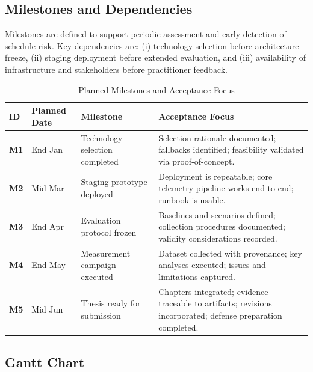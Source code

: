\subsection{Milestones and Dependencies}

Milestones are defined to support periodic assessment and early detection of schedule risk. Key dependencies are: (i) technology selection before architecture freeze, (ii) staging deployment before extended evaluation, and (iii) availability of infrastructure and stakeholders before practitioner feedback.

\begin{table}[htbp]
\centering
\caption{Planned Milestones and Acceptance Focus}
\label{tab:milestones}
\footnotesize
\begin{tabular}{@{}p{}p{}p{}p{}@{}}
		\toprule
		\textbf{ID} & \textbf{Planned Date} & \textbf{Milestone} & \textbf{Acceptance Focus} \\
\midrule
		\textbf{M1} & End Jan & Technology selection completed & Selection rationale documented; fallbacks identified; feasibility validated via proof-of-concept. \\
\addlinespace
		\textbf{M2} & Mid Mar & Staging prototype deployed & Deployment is repeatable; core telemetry pipeline works end-to-end; runbook is usable. \\
\addlinespace
		\textbf{M3} & End Apr & Evaluation protocol frozen & Baselines and scenarios defined; collection procedures documented; validity considerations recorded. \\
\addlinespace
		\textbf{M4} & End May & Measurement campaign executed & Dataset collected with provenance; key analyses executed; issues and limitations captured. \\
\addlinespace
		\textbf{M5} & Mid Jun & Thesis ready for submission & Chapters integrated; evidence traceable to artifacts; revisions incorporated; defense preparation completed. \\
\bottomrule
\end{tabular}
\end{table}

\subsection{Gantt Chart}

